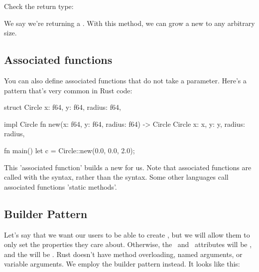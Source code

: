 Check the return type:

\begin{rustc}
fn grow(&self, increment: f64) -> Circle {
\end{rustc}

We say we're returning a . With this method, we can grow a new  to any arbitrary size.

\subsection*{Associated functions}

You can also define associated functions that do not take a  parameter. Here's a pattern that's very common in Rust code:

\begin{rustc}
struct Circle {
    x: f64,
    y: f64,
    radius: f64,
}

impl Circle {
    fn new(x: f64, y: f64, radius: f64) -> Circle {
        Circle {
            x: x,
            y: y,
            radius: radius,
        }
    }
}

fn main() {
    let c = Circle::new(0.0, 0.0, 2.0);
}
\end{rustc}

This 'associated function' builds a new  for us. Note that associated functions are called with the  
syntax, rather than the  syntax. Some other languages call associated functions 'static methods'.

\subsection*{Builder Pattern}

Let's say that we want our users to be able to create , but we will allow them to only set the properties they care about. 
Otherwise, the \x\ and \y\ attributes will be , and the  will be . Rust doesn't have method overloading, 
named arguments, or variable arguments. We employ the builder pattern instead. It looks like this:

